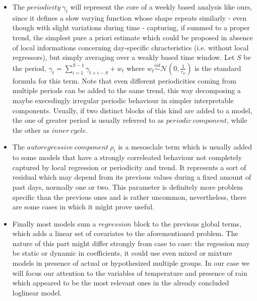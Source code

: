 \documentclass[11pt,twoside]{report}
\begin{document}
\begin{itemize}
	\item The $ periodicity\ \gamma_t $ will represent the core of a weekly based analysis like ours, since it defines a slow varying function whose shape repeats similarly - even though with slight variations during time - capturing, if summed to a proper trend, the simplest pure a priori estimate which could be proposed in absence of local informations concerning day-specific chracteristics (i.e. without local regressors), but simply averaging over a weakly based time window. Let $ S $ be the period, $ \gamma_t = \sum_{i=1}^{S-1}\gamma_{t+i-S} + w_t $ where $ w_t\overset{iid}{\sim}\mathcal{N}(0,\frac{1}{\tau_w})$ is the standard formula for this term. Note that even different periodicities coming from multiple periods can be added to the same trend, this way decomposing a maybe execedingly irregular periodic behaviour in simpler interpretable components. Usually, if two distinct blocks of this kind are added to a model, the one of greater period is usually referred to as $ periodic\ component $, while the other as $ inner\ cycle $.
	\item The $ autoregressive\ component\ \rho_t$ is a mesosclale term which is usually added to some models that have a strongly correleated behaviour not completely captured by local regression or periodicity and trend. It represents a sort of residual which may depend from its previous values during a fixed amount of past days, normally one or two. This parameter is definitely more problem specific than the previous ones and is rather uncommon, nevertheless, there are some cases in which it might prove useful.
	\item Finally most models sum a $regression $ block to the previous global terms, which adds a linear set of covariates to the aforementioned problem. The nature of this part might differ strongly from case to case: the regession may be static or dynamic in coefficients, it could use even mixed or mixture models in presence of actual or hypothesized multiple groups. In our case we will focus our attention to the variables of temperature and presence of rain which appeared to be the most relevant ones in the already concluded loglinear model.
\end{itemize}
\end{document}

